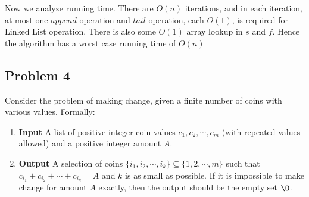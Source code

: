\documentclass[11pt]{article}
\begin{document}
\begin{enumerate}
   Now we analyze running time. There are $O(n)$ iterations, and in each iteration, at most one $append$ operation and $tail$ operation, each $O(1)$, is required for Linked List operation. There is also some $O(1)$ array lookup in $s$ and $f$. Hence the algorithm has a worst case running time of $O(n)$



\end{enumerate}




\subsection*{Problem 4}
Consider the problem of making change, given a finite number of coins with various values. Formally:
\begin{enumerate}
  \item \textbf{Input} A list of positive integer coin values $c_1, c_2, \cdots, c_m$ (with repeated values allowed) and a positive integer amount $A$.
  \item \textbf{Output}  A selection of coins $\{i_1,i_2,\cdots,i_k\}\subseteq \{1,2,\cdots,m\}$ such that $c_{i_1} +c_{i_2} +\cdots+c_{i_k} = A$ and $k$ is as small as possible. If it is impossible to make change for amount $A$ exactly, then the output should be the empty set $\O$.
\end{enumerate}
\end{document}
